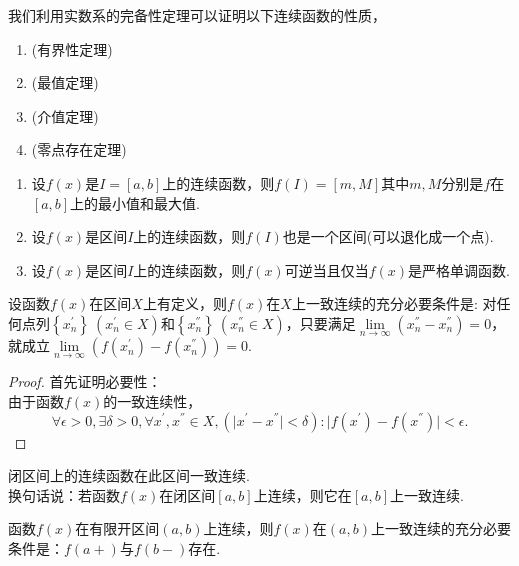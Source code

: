 	我们利用实数系的完备性定理可以证明以下连续函数的性质，
	\begin{theorem}[闭区间上连续函数的性质]
		\begin{enumerate}
			\item (有界性定理)
			\item (最值定理)
			\item (介值定理)
			\item (零点存在定理)
		\end{enumerate}
	\end{theorem}
	\begin{corollary}
		\begin{enumerate}
			\item 设$f(x)$是$I=\left[a,b\right]$上的连续函数，则$f(I)=\left[m,M\right]$其中$m,M$分别是$f$在$\left[a,b\right]$上的最小值和最大值.
			\item 设$f(x)$是区间$I$上的连续函数，则$f(I)$也是一个区间(可以退化成一个点).
			\item 设$f(x)$是区间$I$上的连续函数，则$f(x)$可逆当且仅当$f(x)$是严格单调函数.
		\end{enumerate}
	\end{corollary}
	\begin{definition}[一致连续]
		
	\end{definition}
	\begin{theorem}[一致连续性的判断]
		设函数$f(x)$在区间$X$上有定义，则$f(x)$在$X$上一致连续的充分必要条件是: 对任何点列$\left\{x_{n}^{'}\right\}\ (x_{n}^{'}\in X)$和$\left\{x_{n}^{''}\right\}\ (x_{n}^{''}\in X)$，只要满足$\lim\limits_{n\rightarrow\infty}(x_{n}^{''}-x_{n}^{''})=0$，就成立$\lim\limits_{n\rightarrow\infty}(f(x_n^{'})-f(x_n^{''}))=0$.
	\end{theorem}
	\begin{proof}
		首先证明必要性：\\
		由于函数$f(x)$的一致连续性，$$\forall\epsilon>0,\exists\delta>0,\forall x^{'},x^{''}\in X,(\lvert x^{'}-x^{''}\rvert<\delta):\lvert f(x^{'})-f(x^{''})\rvert<\epsilon.$$
	\end{proof}
	\begin{theorem}[Contor定理]
		闭区间上的连续函数在此区间一致连续.\\
		换句话说：若函数$f(x)$在闭区间$\left[a,b\right]$上连续，则它在$\left[a,b\right]$上一致连续.
	\end{theorem}
	\begin{theorem}
		函数$f(x)$在{\kaishu 有限}开区间$(a,b)$上连续，则$f(x)$在$(a,b)$上一致连续的充分必要条件是：$f(a+)$与$f(b-)$存在.
	\end{theorem}
